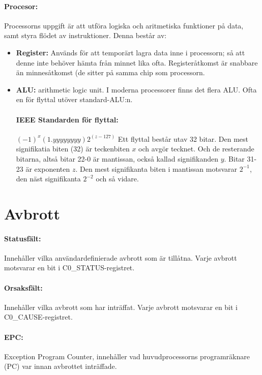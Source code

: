\documentclass[a4paper]{article}
\begin{document}
\paragraph{Procesor:} Processorns uppgift är att utföra logiska och aritmetiska funktioner på data, samt styra flödet av instruktioner. Denna består av:
\begin{itemize}
\item \textbf{Register:} Används för att temporärt lagra data inne i processorn; så att denne inte behöver hämta från minnet lika ofta. Registeråtkomst är snabbare än minnesåtkomst (de sitter på samma chip som processorn.
\item \textbf{ALU:} arithmetic logic unit. I moderna processorer finns det flera ALU. Ofta en för flyttal utöver standard-ALU:n.
\paragraph{IEEE Standarden för flyttal:} { \center $ (-1)^x (1.yyyyyyyy) 2^{(z-127)} $ \endcenter }  Ett flyttal består utav 32 bitar. Den mest signifikatia biten (32) är teckenbiten $x$ och avgör tecknet. Och de resterande bitarna, altså bitar 22-0 är mantissan,  också kallad signifikanden $y$. Bitar 31-23  är exponenten $z$. Den mest signifikanta biten i mantissan motsvarar $2^{-1}$, den näst signifikanta $2^{-2}$ och så vidare.
\end{itemize}

\section{Avbrott}
\paragraph{Statusfält:} Innehåller vilka användardefinierade avbrott som är tillåtna. Varje avbrott motsvarar en bit i C0\_STATUS-registret. 
\paragraph{Orsaksfält:} Innehåller vilka avbrott som har inträffat. Varje avbrott motsvarar en bit i C0\_CAUSE-registret.
\paragraph{EPC:} Exception Program Counter, innehåller vad huvudprocessorns programräknare (PC) var innan avbrottet inträffade.  
\end{document}
